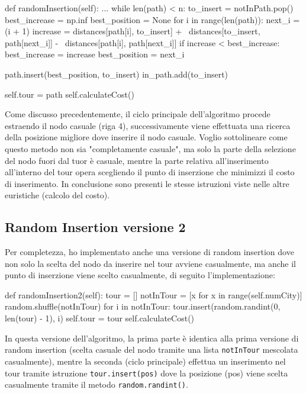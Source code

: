 \documentclass[a4paper,12pt]{report}
\begin{document}
\begin{python}
def randomInsertion(self):
  ...
  while len(path) < n:
    to_insert = notInPath.pop()
    best_increase = np.inf
    best_position = None
    for i in range(len(path)):
      next_i = (i + 1) %
      increase = distances[path[i], to_insert] + \
                 distances[to_insert, path[next_i]] - \
                 distances[path[i], path[next_i]]
      if increase < best_increase:
        best_increase = increase
        best_position = next_i

    path.insert(best_position, to_insert)
    in_path.add(to_insert)

  self.tour = path
  self.calculateCost()
\end{python}
Come discusso precedentemente, il ciclo principale dell'algoritmo procede estraendo il nodo casuale (riga 4), successivamente viene effettuata una ricerca della posizione migliore dove inserire il nodo casuale. Voglio sottolineare come questo metodo non sia "completamente casuale", ma solo la parte della selezione del nodo fuori dal tuor è casuale, mentre la parte relativa all'inserimento all'interno del tour opera scegliendo il punto di inserzione che minimizzi il costo di inserimento. \newline
In conclusione sono presenti le stesse istruzioni viste nelle altre euristiche (calcolo del costo).

\subsection{Random Insertion versione 2}
Per completezza, ho implementato anche una versione di random insertion dove non solo la scelta del nodo da inserire nel tour avviene casualmente, ma anche il punto di inserzione viene scelto casualmente, di seguito l'implementazione:
\begin{python}
def randomInsertion2(self):
    tour = []
    notInTour = [x for x in range(self.numCity)]
    random.shuffle(notInTour)
    for i in notInTour:
      tour.insert(random.randint(0, len(tour) - 1), i)
    self.tour = tour
    self.calculateCost()
\end{python}
In questa versione dell'algoritmo, la prima parte è identica alla prima versione di random insertion (scelta casuale del nodo tramite una lista \lstinline!notInTour! mescolata casualmente), mentre la seconda (ciclo principale) effettua un inserimento nel tour tramite istruzione \lstinline|tour.insert(pos)| dove la posizione (pos) viene scelta casualmente tramite il metodo \lstinline|random.randint()|.
\end{document}
